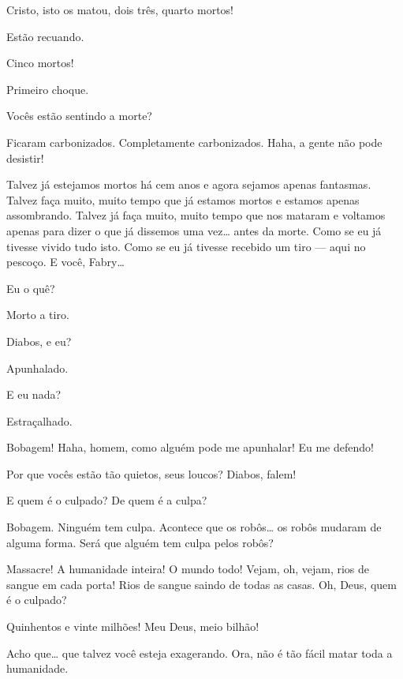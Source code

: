  Cristo, isto os matou, dois três, quarto mortos!

 Estão recuando.

 Cinco mortos!

  Primeiro choque.

 Vocês estão sentindo a morte?

  Ficaram carbonizados. Completamente
carbonizados. Haha, a gente não pode desistir! 

  Talvez já estejamos mortos há cem anos e agora
sejamos apenas fantasmas. Talvez faça muito, muito tempo que já estamos mortos e
 estamos apenas assombrando. Talvez já faça muito, muito tempo que nos mataram e
voltamos apenas para dizer o que já dissemos uma vez\ldots{} antes da morte.
Como se eu já tivesse vivido tudo isto. Como se eu já tivesse recebido um tiro
--- aqui no pescoço. E você, Fabry\ldots{}

 Eu o quê?

 Morto a tiro.

 Diabos, e eu?

 Apunhalado.

 E eu nada?

Estraçalhado.


 Bobagem! Haha, homem, como alguém pode me apunhalar! Eu me defendo!


 Por que vocês estão tão quietos, seus loucos? Diabos, falem!

 E quem é o culpado? De quem é a culpa?

 Bobagem. Ninguém tem culpa. Acontece que os robôs\ldots{} os robôs
mudaram de alguma forma. Será que alguém tem culpa pelos robôs?

 Massacre! A humanidade inteira! O mundo todo! 
Vejam, oh, vejam, rios de sangue em cada porta! Rios de sangue saindo de
todas as casas. Oh, Deus, quem é o culpado?

  Quinhentos e vinte milhões! Meu Deus, meio bilhão!

 Acho que\ldots{} que talvez você esteja exagerando. Ora, não é tão
fácil matar toda a humanidade.

